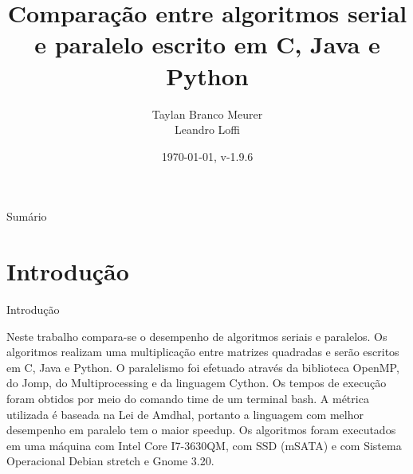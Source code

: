 \documentclass[aspectratio=169]{beamer}
\title{Comparação entre algoritmos serial e paralelo escrito em C,
Java e Python}
\author{Taylan Branco Meurer \\ Leandro Loffi}
\institute{Programação Paralela e Multicore
	    \par
	    7º fase BCC}
\date{\today, v-1.9.6}
\begin{document}

\begin{frame}{Sumário}
\tableofcontents
\end{frame}

\section{Introdução}

\begin{frame}{Introdução}

Neste trabalho compara-se o desempenho de algoritmos seriais e paralelos. Os algoritmos realizam uma multiplicação entre matrizes quadradas e serão escritos em C, Java e Python. O paralelismo foi efetuado através da biblioteca OpenMP, do Jomp, do Multiprocessing e da linguagem Cython. Os tempos de execução foram obtidos por meio do comando time de um terminal bash. A métrica utilizada é baseada na Lei de Amdhal, portanto a linguagem com melhor desempenho em paralelo tem o maior speedup. Os algoritmos foram executados em uma máquina com Intel Core I7-3630QM, com SSD (mSATA) e com Sistema Operacional Debian stretch e Gnome 3.20.

\end{frame}
\end{document}
